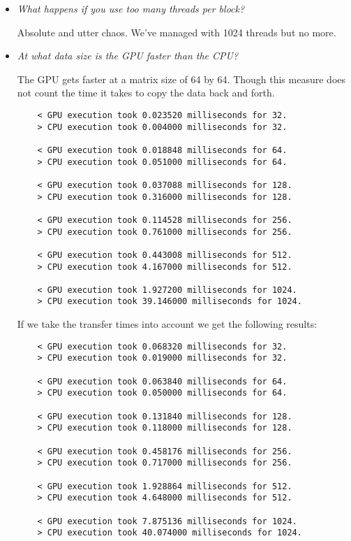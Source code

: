 \documentclass[a4paper,12pt]{article}
\begin{document}
\begin{itemize}
\item \textit{What happens if you use too many threads per block?}

  Absolute and utter chaos. We've managed with 1024 threads but no more.

\item \textit{At what data size is the GPU faster than the CPU?}

  The GPU gets faster at a matrix size of 64 by 64. Though this measure does not count the time it takes to copy the data back and forth.

  \begin{lstlisting}
    < GPU execution took 0.023520 milliseconds for 32.
    > CPU execution took 0.004000 milliseconds for 32.

    < GPU execution took 0.018848 milliseconds for 64.
    > CPU execution took 0.051000 milliseconds for 64.

    < GPU execution took 0.037088 milliseconds for 128.
    > CPU execution took 0.316000 milliseconds for 128.

    < GPU execution took 0.114528 milliseconds for 256.
    > CPU execution took 0.761000 milliseconds for 256.

    < GPU execution took 0.443008 milliseconds for 512.
    > CPU execution took 4.167000 milliseconds for 512.

    < GPU execution took 1.927200 milliseconds for 1024.
    > CPU execution took 39.146000 milliseconds for 1024.
  \end{lstlisting}

  If we take the transfer times into account we get the following results:

  \begin{lstlisting}
    < GPU execution took 0.068320 milliseconds for 32.
    > CPU execution took 0.019000 milliseconds for 32.

    < GPU execution took 0.063840 milliseconds for 64.
    > CPU execution took 0.050000 milliseconds for 64.

    < GPU execution took 0.131840 milliseconds for 128.
    > CPU execution took 0.118000 milliseconds for 128.

    < GPU execution took 0.458176 milliseconds for 256.
    > CPU execution took 0.717000 milliseconds for 256.

    < GPU execution took 1.928864 milliseconds for 512.
    > CPU execution took 4.648000 milliseconds for 512.

    < GPU execution took 7.875136 milliseconds for 1024.
    > CPU execution took 40.074000 milliseconds for 1024.
  \end{lstlisting}


\end{itemize}
\end{document}
